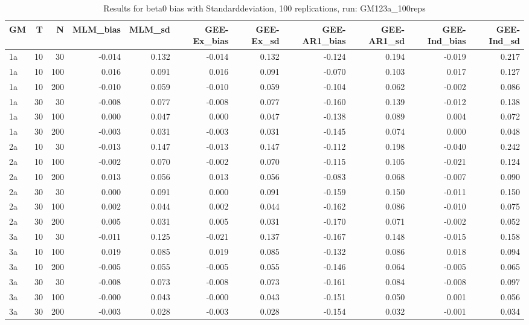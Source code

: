 \begin{table}[ht]
\centering
\begin{tabular}{lrrrrrrrrrr}
  \hline
GM & T & N & MLM\_bias & MLM\_sd & GEE-Ex\_bias & GEE-Ex\_sd & GEE-AR1\_bias & GEE-AR1\_sd & GEE-Ind\_bias & GEE-Ind\_sd \\ 
  \hline
1a & 10 & 30 & -0.014 & 0.132 & -0.014 & 0.132 & -0.124 & 0.194 & -0.019 & 0.217 \\ 
  1a & 10 & 100 & 0.016 & 0.091 & 0.016 & 0.091 & -0.070 & 0.103 & 0.017 & 0.127 \\ 
  1a & 10 & 200 & -0.010 & 0.059 & -0.010 & 0.059 & -0.104 & 0.062 & -0.002 & 0.086 \\ 
  1a & 30 & 30 & -0.008 & 0.077 & -0.008 & 0.077 & -0.160 & 0.139 & -0.012 & 0.138 \\ 
  1a & 30 & 100 & 0.000 & 0.047 & 0.000 & 0.047 & -0.138 & 0.089 & 0.004 & 0.072 \\ 
  1a & 30 & 200 & -0.003 & 0.031 & -0.003 & 0.031 & -0.145 & 0.074 & 0.000 & 0.048 \\ 
   \hline
2a & 10 & 30 & -0.013 & 0.147 & -0.013 & 0.147 & -0.112 & 0.198 & -0.040 & 0.242 \\ 
  2a & 10 & 100 & -0.002 & 0.070 & -0.002 & 0.070 & -0.115 & 0.105 & -0.021 & 0.124 \\ 
  2a & 10 & 200 & 0.013 & 0.056 & 0.013 & 0.056 & -0.083 & 0.068 & -0.007 & 0.090 \\ 
  2a & 30 & 30 & 0.000 & 0.091 & 0.000 & 0.091 & -0.159 & 0.150 & -0.011 & 0.150 \\ 
  2a & 30 & 100 & 0.002 & 0.044 & 0.002 & 0.044 & -0.162 & 0.086 & -0.010 & 0.075 \\ 
  2a & 30 & 200 & 0.005 & 0.031 & 0.005 & 0.031 & -0.170 & 0.071 & -0.002 & 0.052 \\ 
   \hline
3a & 10 & 30 & -0.011 & 0.125 & -0.021 & 0.137 & -0.167 & 0.148 & -0.015 & 0.158 \\ 
  3a & 10 & 100 & 0.019 & 0.085 & 0.019 & 0.085 & -0.132 & 0.086 & 0.018 & 0.094 \\ 
  3a & 10 & 200 & -0.005 & 0.055 & -0.005 & 0.055 & -0.146 & 0.064 & -0.005 & 0.065 \\ 
  3a & 30 & 30 & -0.008 & 0.073 & -0.008 & 0.073 & -0.161 & 0.084 & -0.008 & 0.097 \\ 
  3a & 30 & 100 & -0.000 & 0.043 & -0.000 & 0.043 & -0.151 & 0.050 & 0.001 & 0.056 \\ 
  3a & 30 & 200 & -0.003 & 0.028 & -0.003 & 0.028 & -0.154 & 0.032 & -0.001 & 0.034 \\ 
   \hline
\end{tabular}
\caption{Results for beta0 bias with Standarddeviation, 100 replications, run: GM123a_100reps} 
\label{tab:beta0_bias_sd}
\end{table}
